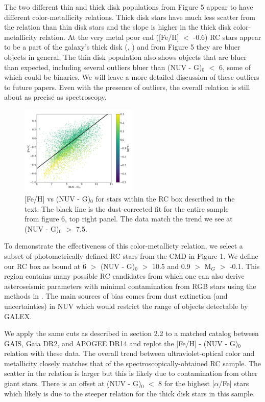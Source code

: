 \documentclass[twocolumn]{emulateapj}
\begin{document}
The two different thin and thick disk populations from Figure 5 appear to have different color-metallicity relations. Thick disk stars have much less scatter from the relation than thin disk stars and the slope is higher in the thick disk color-metallicity relation. At the very metal poor end ([Fe/H] $<$ -0.6) RC stars appear to be a part of the galaxy's thick disk (\citealt{brook12}, \citealt{hawkins15}) and from Figure 5 they are bluer objects in general. The thin disk population also shows objects that are bluer than expected, including several outliers bluer than (NUV - G)$_0$ $<$ 6, some of which could be binaries. We will leave a more detailed discussion of these outliers to future papers. Even with the presence of outliers, the overall relation is still about as precise as spectroscopy. 

\begin{figure}[]
\centering
\includegraphics[width=0.5\textwidth]{f7.pdf}
\caption{[Fe/H] vs (NUV - G)$_0$ for stars within the RC box described in the text. The black line is the dust-corrected fit for the entire sample from figure 6, top right panel. The data match the trend we see at (NUV - G)$_0$ $>$ 7.5.}
\end{figure}

To demonstrate the effectiveness of this color-metallicty relation, we select a subset of photometrically-defined RC stars from the CMD in Figure 1. We define our RC box as bound at 6 $>$ (NUV - G)$_0$ $>$ 10.5 and 0.9 $>$ M$_G$ $>$ -0.1. This region contains many possible RC candidates from which one can also derive asteroseismic parameters with minimal contamination from RGB stars using the methods in \citealt{hawkins18}. The main sources of bias comes from dust extinction (and uncertainties) in NUV which would restrict the range of objects detectable by GALEX.

We apply the same cuts as described in section 2.2 to a matched catalog between GAIS, Gaia DR2, and APOGEE DR14 and replot the [Fe/H] - (NUV - G)$_0$ relation with these data. The overall trend between ultraviolet-optical color and metallicity closely matches that of the spectroscopically-obtained RC sample. The scatter in the relation is larger but this is likely due to contamination from other giant stars. There is an offset at (NUV - G)$_0$ $<$ 8 for the highest [$\alpha$/Fe] stars which likely is due to the steeper relation for the thick disk stars in this sample. 
\end{document}
